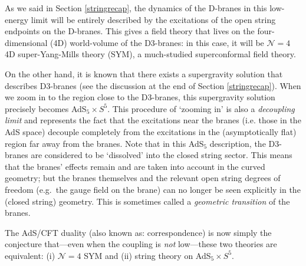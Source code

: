 \documentclass[12pt]{article}
\renewcommand{\^}[1]{\hat{#1}}
\begin{document}
As we said in Section \ref{stringrecap}, the dynamics of the D-branes in this low-energy limit will be entirely described by the excitations of the open string endpoints on the D-branes. This gives a field theory that lives on the four-dimensional (4D) world-volume of the D3-branes: in this case, it will be $\mathcal{N}=4$ 4D super-Yang-Mills theory  (SYM), a much-studied  superconformal field theory.

On the other hand, it is known that there exists a supergravity solution that describes D3-branes (see the discussion at the end of Section \ref{stringrecap}).
When we zoom in to the region close to the D3-branes, this supergravity solution precisely becomes AdS$_5\times S^5$. This procedure of `zooming in' is also a \emph{decoupling limit} and represents the fact that 
the excitations near the branes (i.e. those in the AdS space) decouple completely from the excitations in the (asymptotically flat) region far away from the branes.
Note that in this AdS$_5$ description, the D3-branes are considered to be `dissolved'
into the closed string sector. This means that the branes' effects remain and are taken into account in the curved geometry; but the branes themselves and the relevant open string degrees of freedom (e.g.~the gauge field on the brane) can no longer be seen explicitly in the (closed string) geometry. This is sometimes called a \emph{geometric transition} of the branes.

The AdS/CFT duality (also known as: correspondence) is now simply the conjecture that---even when the coupling is {\em not} low---these two theories are equivalent: (i) $\mathcal{N}=4$ SYM and (ii) string theory on AdS$_5\times S^5$. 
\end{document}

